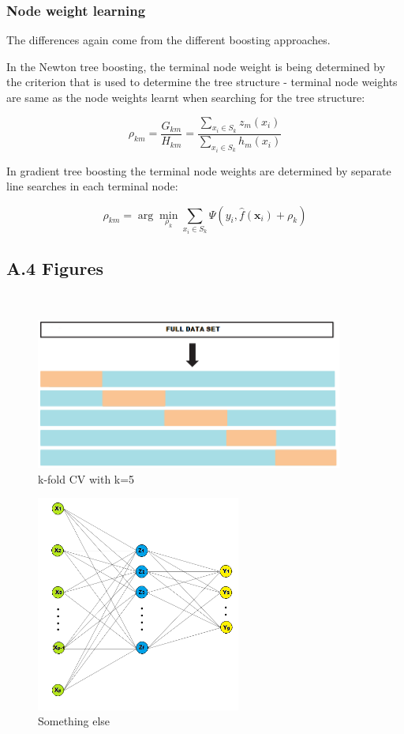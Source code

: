 \documentclass[12pt,]{article}
\begin{document}
\hypertarget{node-weight-learning}{%
\subsubsection{Node weight learning}\label{node-weight-learning}}

The differences again come from the different boosting approaches.

In the Newton tree boosting, the terminal node weight is being
determined by the criterion that is used to determine the tree structure
- terminal node weights are same as the node weights learnt when
searching for the tree structure:

\[\rho_{km}=\frac{G_{km}}{H_{km}}=\frac{\sum_{x_i\in S_k}z_m(x_i)}{\sum_{x_i\in S_k}h_m(x_i)}\]

In gradient tree boosting the terminal node weights are determined by
separate line searches in each terminal node:

\[\rho_{km} = \arg\min_{\rho_k}\sum_{x_i\in S_k}\Psi(y_i,\widehat{f}(\mathbf{x}_{i})+\rho_k)\]

\clearpage

\hypertarget{a.4-figures}{%
\subsection{A.4 Figures}\label{a.4-figures}}

\(\;\)

\begin{figure}
\centering
\includegraphics[width=0.9\textwidth,height=\textheight]{figures/crossval.png}
\caption{k-fold CV with k=5}
\end{figure}

\begin{figure}
\centering
\includegraphics[width=0.6\textwidth,height=\textheight]{figures/nnet.png}
\caption{Something else}
\end{figure}
\end{document}
